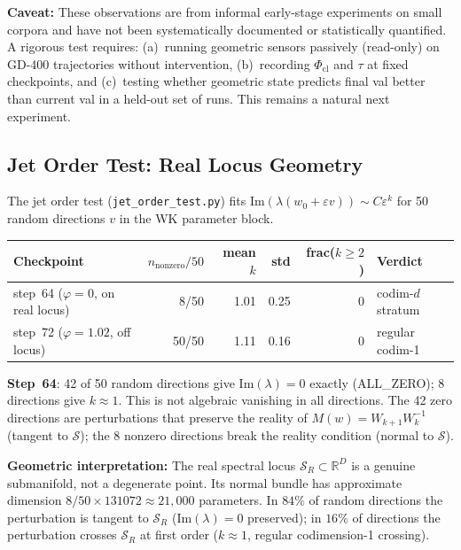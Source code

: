 \documentclass[11pt]{amsart}
\begin{document}
\textbf{Caveat:}
These observations are from informal early-stage experiments on small
corpora and have not been systematically documented or statistically
quantified.
A rigorous test requires: (a)~running geometric sensors passively
(read-only) on GD-400 trajectories without intervention,
(b)~recording $\Phi_\mathrm{cl}$ and $\tau$ at fixed checkpoints,
and (c)~testing whether geometric state predicts final val better than
current val in a held-out set of runs.
This remains a natural next experiment.

\subsection{Jet Order Test: Real Locus Geometry}
\label{sec:jet_order}

The jet order test (\texttt{jet\_order\_test.py}) fits
$\mathrm{Im}(\lambda(w_0+\varepsilon v)) \sim C\varepsilon^k$
for 50 random directions $v$ in the WK parameter block.

\begin{center}
\small
\begin{tabular}{@{}lrrrrl@{}}
\toprule
Checkpoint & $n_\mathrm{nonzero}/50$ & mean $k$ & std & frac($k\geq 2$) & Verdict \\
\midrule
step~64 ($\varphi=0$, on real locus)
  & 8/50 & 1.01 & 0.25 & 0 & codim-$d$ stratum \\
step~72 ($\varphi=1.02$, off locus)
  & 50/50 & 1.11 & 0.16 & 0 & regular codim-1 \\
\bottomrule
\end{tabular}
\end{center}

\textbf{Step~64}: 42 of 50 random directions give $\mathrm{Im}(\lambda) = 0$
exactly (ALL\_ZERO); 8 directions give $k \approx 1$.
This is not algebraic vanishing in all directions.
The 42 zero directions are perturbations that preserve the reality of
$M(w) = W_{k+1}W_k^{-1}$ (tangent to $\mathcal{S}$);
the 8 nonzero directions break the reality condition (normal to $\mathcal{S}$).

\textbf{Geometric interpretation:}
The real spectral locus $\mathcal{S}_R \subset \mathbb{R}^D$ is a genuine
submanifold, not a degenerate point.
Its normal bundle has approximate dimension
$8/50 \times 131072 \approx 21{,}000$ parameters.
In $84\%$ of random directions the perturbation is tangent to $\mathcal{S}_R$
($\mathrm{Im}(\lambda) = 0$ preserved);
in $16\%$ of directions the perturbation crosses $\mathcal{S}_R$ at
first order ($k \approx 1$, regular codimension-1 crossing).
\end{document}
